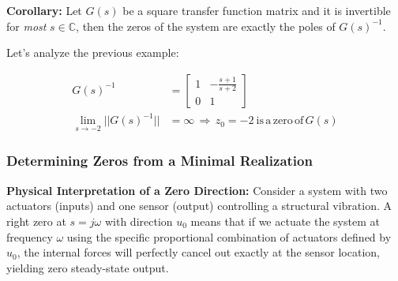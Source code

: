 \documentclass[twoside]{article}
\begin{document}
\textbf{Corollary:} Let $G(s)$ be a square transfer function matrix and it is invertible for \textit{most} $s \in \mathbb{C}$, then the zeros of the system
are exactly the poles of $G(s)^{-1}$. 

Let's analyze the previous example:

\begin{align*}
G(s)^{-1} &= \begin{bmatrix} 1 & -\frac{s+1}{s+2}  \\  
	0 & 1  \end{bmatrix}
	\\
\lim_{s \to -2} || G(s)^{-1} || &= \infty \, \Rightarrow \, z_0 = - 2 \ \mathrm{is} \, \mathrm{a} \, \mathrm{zero} \, \mathrm{of} \, G(s)
\end{align*}

\subsubsection{Determining Zeros from a Minimal Realization}

\textbf{Physical Interpretation of a Zero Direction:} Consider a system with two actuators (inputs) and one sensor (output) controlling a structural vibration. A right zero at $s = j\omega$ with direction $u_0$ means that if we actuate the system at frequency $\omega$ using the specific proportional combination of actuators defined by $u_0$, the internal forces will perfectly cancel out exactly at the sensor location, yielding zero steady-state output.
\end{document}
